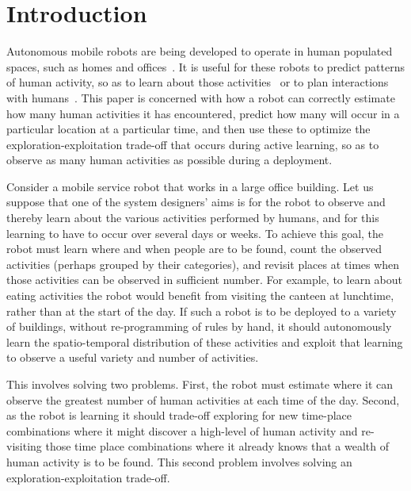 

\section{Introduction}
\label{sec:introduction}

Autonomous mobile robots are being developed to operate in human populated spaces, such as homes and offices~\cite{hawes2016strands}. It is useful for these robots to predict patterns of human activity, so as to learn about those activities~\cite{coppola2016learning,duckworth2016a} or to plan interactions with humans~\cite{2020AAMAS_street}. This paper is concerned with how a robot can correctly estimate how many human activities it has encountered, predict how many will occur in a particular location at a particular time, and then use these to optimize the exploration-exploitation trade-off that occurs during active learning, so as to observe as many human activities as possible during a deployment.

Consider a mobile service robot that works in a large office building. Let us suppose that one of the system designers' aims is for the robot to observe and thereby learn about the various activities performed by humans, and for this learning to have to occur over several days or weeks. To achieve this goal, the robot must learn where and when people are to be found, count the observed activities (perhaps grouped by their categories), and revisit places at times when those activities can be observed in sufficient number. For example, to learn about eating activities the robot would benefit from visiting the canteen at lunchtime, rather than at the start of the day. If such a robot is to be deployed to a variety of buildings, without re-programming of rules by hand, it should autonomously learn the spatio-temporal distribution of these activities and exploit that learning to observe a useful variety and number of activities.

This involves solving two problems. First, the robot must estimate where it can observe the greatest number of human activities at each time of the day. Second, as the robot is learning it should trade-off exploring for new time-place combinations where it might discover a high-level of human activity and re-visiting those time place combinations where it already knows that a wealth of human activity is to be found. This second problem involves solving an exploration-exploitation trade-off. 

